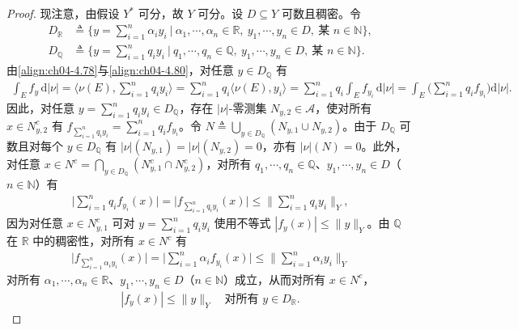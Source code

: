 \documentclass[../../main.tex]{subfiles}%
\begin{document}
\begin{proof}
现注意，由假设 $Y^*$ 可分，故 $Y$ 可分。设 $D\subseteq Y$ 可数且稠密。令
\begin{align*}
D_{\mathbb R}&\triangleq \Big\{y=\sum_{i=1}^n\alpha_iy_i\ \Big|\ \alpha_1,\cdots,\alpha_n\in\mathbb{R},\ y_1,\cdots,y_n\in D,\ \text{某 }n\in\mathbb{N}\Big\},\\
D_{\mathbb Q}&\triangleq \Big\{y=\sum_{i=1}^nq_iy_i\ \Big|\ q_1,\cdots,q_n\in\mathbb{Q},\ y_1,\cdots,y_n\in D,\ \text{某 }n\in\mathbb{N}\Big\}.
\end{align*}
由\eqref{align:ch04-4.78}与\eqref{align:ch04-4.80}，对任意 $y\in D_{\mathbb Q}$ 有
\begin{align*}
\int_E f_y\,\mathrm{d}|\nu|=\Big\langle\nu(E),\sum_{i=1}^nq_iy_i\Big\rangle=\sum_{i=1}^nq_i\langle\nu(E),y_i\rangle
=\sum_{i=1}^nq_i\int_E f_{y_i}\,\mathrm{d}|\nu|=\int_E\Big(\sum_{i=1}^nq_if_{y_i}\Big)\mathrm{d}|\nu|.
\end{align*}
因此，对任意 $y=\sum_{i=1}^nq_iy_i\in D_{\mathbb Q}$，存在 $|\nu|$-零测集 $N_{y,2}\in\mathcal{A}$，使对所有 $x\in N_{y,2}^c$ 有 $f_{\sum_{i=1}^nq_iy_i}=\sum_{i=1}^nq_if_{y_i}$。令 $N\triangleq\bigcup_{y\in D_{\mathbb Q}}(N_{y,1}\cup N_{y,2})$。由于 $D_{\mathbb Q}$ 可数且对每个 $y\in D_{\mathbb Q}$ 有 $|\nu|(N_{y,1})=|\nu|(N_{y,2})=0$，亦有 $|\nu|(N)=0$。此外，对任意 $x\in N^c=\bigcap_{y\in D_{\mathbb Q}}(N_{y,1}^c\cap N_{y,2}^c)$，对所有 $q_1,\cdots,q_n\in\mathbb{Q}$、$y_1,\cdots,y_n\in D$（$n\in\mathbb{N}$）有
\begin{align*}
\Big|\sum_{i=1}^nq_if_{y_i}(x)\Big|=\Big|f_{\sum_{i=1}^nq_iy_i}(x)\Big|\leqslant\Big\|\sum_{i=1}^nq_iy_i\Big\|_Y,
\end{align*}
因为对任意 $x\in N_{y,1}^c$ 可对 $y=\sum_{i=1}^nq_iy_i$ 使用不等式 $|f_y(x)|\leqslant\|y\|_Y$。由 $\mathbb{Q}$ 在 $\mathbb{R}$ 中的稠密性，对所有 $x\in N^c$ 有
\begin{align*}
\Big|f_{\sum_{i=1}^n\alpha_iy_i}(x)\Big|=\Big|\sum_{i=1}^n\alpha_if_{y_i}(x)\Big|\leqslant\Big\|\sum_{i=1}^n\alpha_iy_i\Big\|_Y
\end{align*}
对所有 $\alpha_1,\cdots,\alpha_n\in\mathbb{R}$、$y_1,\cdots,y_n\in D$（$n\in\mathbb{N}$）成立，从而对所有 $x\in N^c$，
\begin{align}
|f_y(x)|\leqslant\|y\|_Y\quad\text{对所有 }y\in D_{\mathbb R}. \label{align:ch04-4.81}
\end{align}


\end{proof}
\end{document}
